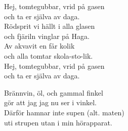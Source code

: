 \documentclass[a6paper, 10pt, twoside]{article}
\begin{document}
\newpage
\noindent
\begin{center}
\end{center}
\begin{lyrics}
Hej, tomtegubbar, vrid på gasen \\
och ta er själva av daga. \\
Rödsprit vi hällt i alla glasen \\
och fjäriln vinglar på Haga. \\
Av akvavit en får kolik \\
och alla tomtar skola-sto-lik. \\
Hej, tomtegubbar, vrid på gasen \\
och ta er själva av daga. 
\end{lyrics}
\vspace{55pt}
\begin{center}
\end{center}
\begin{lyrics}
Brännvin, öl, och gammal finkel \\
gör att jag jag nu ser i vinkel. \\
Därför hamnar inte supen (alt. maten) \\
uti strupen utan i min hörapparat. \\
\end{lyrics}
\end{document}
